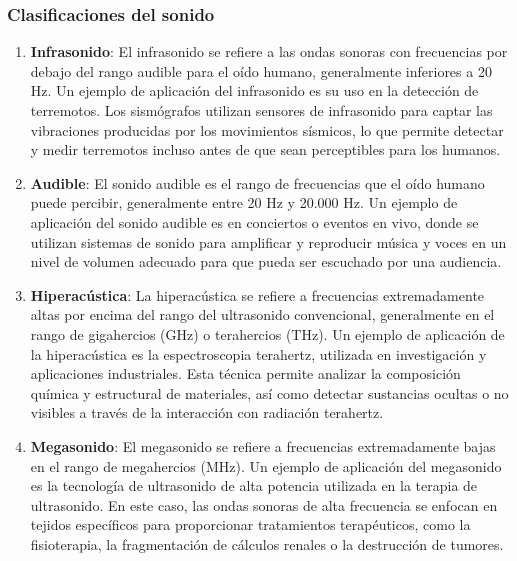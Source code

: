 \documentclass[
	12pt, %
	fleqn, %
	a4paper, %
	oneside, %
]{LegrandOrangeBook}
\begin{document}
\subsubsection{Clasificaciones del sonido}
\begin{enumerate}
\item \textbf{Infrasonido}: El infrasonido se refiere a las ondas sonoras con frecuencias por debajo del rango audible para el oído humano, generalmente inferiores a 20 Hz. Un ejemplo de aplicación del infrasonido es su uso en la detección de terremotos. Los sismógrafos utilizan sensores de infrasonido para captar las vibraciones producidas por los movimientos sísmicos, lo que permite detectar y medir terremotos incluso antes de que sean perceptibles para los humanos.
\item \textbf{Audible}: El sonido audible es el rango de frecuencias que el oído humano puede percibir, generalmente entre 20 Hz y 20.000 Hz. Un ejemplo de aplicación del sonido audible es en conciertos o eventos en vivo, donde se utilizan sistemas de sonido para amplificar y reproducir música y voces en un nivel de volumen adecuado para que pueda ser escuchado por una audiencia.
\item \textbf{Hiperacústica}: La hiperacústica se refiere a frecuencias extremadamente altas por encima del rango del ultrasonido convencional, generalmente en el rango de gigahercios (GHz) o terahercios (THz). Un ejemplo de aplicación de la hiperacústica es la espectroscopia terahertz, utilizada en investigación y aplicaciones industriales. Esta técnica permite analizar la composición química y estructural de materiales, así como detectar sustancias ocultas o no visibles a través de la interacción con radiación terahertz.
\item \textbf{Megasonido}: El megasonido se refiere a frecuencias extremadamente bajas en el rango de megahercios (MHz). Un ejemplo de aplicación del megasonido es la tecnología de ultrasonido de alta potencia utilizada en la terapia de ultrasonido. En este caso, las ondas sonoras de alta frecuencia se enfocan en tejidos específicos para proporcionar tratamientos terapéuticos, como la fisioterapia, la fragmentación de cálculos renales o la destrucción de tumores.
\end{enumerate}
\end{document}
